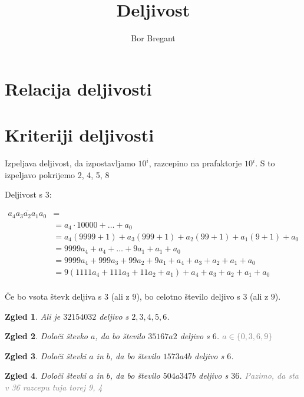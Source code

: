 \documentclass{article}
\title{Deljivost}
\author{Bor Bregant}
\date{\vspace{-5ex}}
\newtheorem*{zgled}{Zgled}
\begin{document}
\maketitle

\section{Relacija deljivosti}


\section{Kriteriji deljivosti}

Izpeljava deljivost, da izpostavljamo $10^i$, razcepino na prafaktorje $10^i$. S to izpeljavo pokrijemo 2, 4, 5, 8

Deljivost s $3$:

\begin{align*}
\overline{a_4 a_3 a_2 a_1 a_0} &=\\
 &=a_4 \cdot 10000 + \ldots + a_0\\
 &=a_4 (9999+1)+a_3(999+1)+a_2(99+1)+a_1(9+1)+a_0\\
 &=9999a_4 + a_4 + \ldots + 9a_1 +a_1 +a_0\\
 &=9999a_4+999a_3+99a_2+9a_1 +a_4+a_3+a_2+a_1+a_0\\
 &=9(1111a_4 +111a_3+11a_2+a_1)+a_4+a_3+a_2+a_1+a_0\\
\end{align*}

Če bo vsota števk deljiva s $3$ (ali z $9$), bo celotno število deljivo s $3$ (ali z $9$).

\begin{zgled}
    Ali je $32154032$ deljivo s $2,3,4,5,6$.
\end{zgled}

\begin{zgled}
    Določi števko $a$, da bo število $35167a2$ deljivo s $6$. \textcolor{gray}{$a\in\{0,3,6,9\}$}
\end{zgled}

\begin{zgled}
    Določi števki $a$ in $b$, da bo število $1573a4b$ deljivo s $6$.
\end{zgled}

\begin{zgled}
    Določi števki $a$ in $b$, da bo število $504a347b$ deljivo s $36$. \textcolor{gray}{Pazimo, da sta v 36 razcepu tuja torej 9, 4}
\end{zgled}
\end{document}
